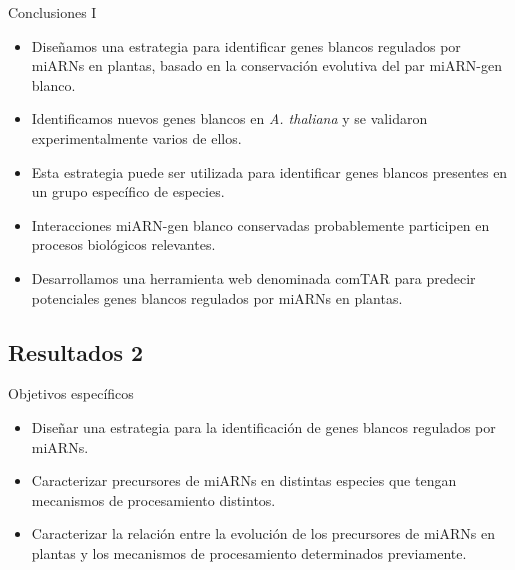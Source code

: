 \documentclass{beamer}
\begin{document}
\begin{frame}{Conclusiones I}
	\begin{itemize}
        \item<1-> Diseñamos una estrategia para identificar genes blancos regulados por miARNs en plantas, basado en la conservación evolutiva del par miARN-gen blanco.
        \item<1-> Identificamos nuevos genes blancos en \textit{A. thaliana} y se validaron experimentalmente varios de ellos.
        \item<1-> Esta estrategia puede ser utilizada para identificar genes blancos presentes en un grupo específico de especies.
        \item<2-> Interacciones miARN-gen blanco conservadas probablemente participen en procesos biológicos relevantes.
        \item<3-> Desarrollamos una herramienta web denominada comTAR para predecir potenciales genes blancos regulados por miARNs en plantas.
	\end{itemize}
\end{frame}

\subsection{Resultados 2}

\begin{frame}{Objetivos específicos}
		\pause
		\begin{itemize}
            \item<-1> Diseñar una estrategia para la identificación de genes blancos regulados por miARNs.
			\item<-2> Caracterizar precursores de miARNs en distintas especies que tengan mecanismos de procesamiento distintos.
			\item<-1> Caracterizar la relación entre la evolución de los precursores de miARNs en plantas y los mecanismos de procesamiento determinados previamente.
        \end{itemize}
\end{frame}

\end{document}

